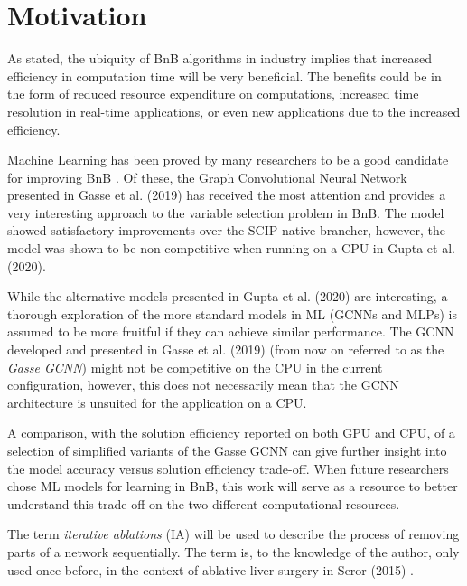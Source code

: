 \section{Motivation}\label{sec:int_motivation}

As stated, the ubiquity of \gls{BnB} algorithms in industry implies that increased efficiency in computation time will be very beneficial. The benefits could be in the form of reduced resource expenditure on computations, increased time resolution in real-time applications, or even new applications due to the increased efficiency.  

Machine Learning has been proved by many researchers to be a good candidate for improving \gls{BnB} \cite{khalil2016learning,gasse2019exact,gupta2020hybrid,khalil2020towards,etheve2020reinforcement}. Of these, the Graph Convolutional Neural Network presented in Gasse et al. (2019) \cite{gasse2019exact} has received the most attention and provides a very interesting approach to the variable selection problem in \gls{BnB}. The model showed satisfactory improvements over the \gls{SCIP} native brancher, however, the model was shown to be non-competitive when running on a \gls{CPU} in Gupta et al. (2020). 

While the alternative models presented in Gupta et al. (2020) \cite{gupta2020hybrid} are interesting, a thorough exploration of the more standard models in \gls{ML} (\gls{GCNN}s and \gls{MLP}s) is assumed to be more fruitful if they can achieve similar performance. The \gls{GCNN} developed and presented in Gasse et al. (2019) \cite{gasse2019exact} (from now on referred to as the \textit{Gasse \gls{GCNN}}) might not be competitive on the \gls{CPU} in the current configuration, however, this does not necessarily mean that the \gls{GCNN} architecture is unsuited for the application on a \gls{CPU}.

A comparison, with the solution efficiency reported on both \gls{GPU} and \gls{CPU}, of a selection of simplified variants of the Gasse \gls{GCNN} can give further insight into the model accuracy versus solution efficiency trade-off. When future researchers chose \gls{ML} models for learning in \gls{BnB}, this work will serve as a resource to better understand this trade-off on the two different computational resources.

The term \textit{iterative ablations} (\Gls{IA}) will be used to describe the process of removing parts of a network sequentially. The term is, to the knowledge of the author, only used once before, in the context of ablative liver surgery in Seror (2015) \cite{seror2015ablative}. 

